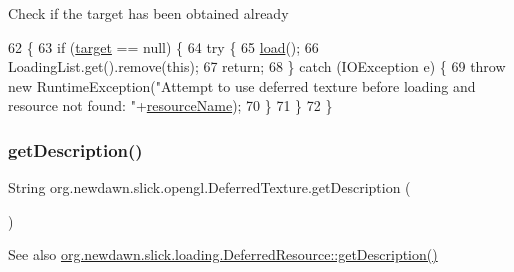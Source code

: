Check if the target has been obtained already 
\begin{DoxyCode}
62                                \{
63         \textcolor{keywordflow}{if} (\mbox{\hyperlink{classorg_1_1newdawn_1_1slick_1_1opengl_1_1_deferred_texture_aa70a4b195d0b965a0099d0e7bc18d9d2}{target}} == null) \{
64             \textcolor{keywordflow}{try} \{
65                 \mbox{\hyperlink{classorg_1_1newdawn_1_1slick_1_1opengl_1_1_deferred_texture_adaa55791770295ee94c057781634b50a}{load}}();
66                 LoadingList.get().remove(\textcolor{keyword}{this});
67                 \textcolor{keywordflow}{return};
68             \} \textcolor{keywordflow}{catch} (IOException e) \{
69                 \textcolor{keywordflow}{throw} \textcolor{keyword}{new} RuntimeException(\textcolor{stringliteral}{"Attempt to use deferred texture before loading and resource not
       found: "}+\mbox{\hyperlink{classorg_1_1newdawn_1_1slick_1_1opengl_1_1_deferred_texture_a883fc20f133626f8f49684adb5b65976}{resourceName}});
70             \}
71         \}
72     \}
\end{DoxyCode}
\mbox{\label{classorg_1_1newdawn_1_1slick_1_1opengl_1_1_deferred_texture_abf9a5bb64c03d9607eb4e2a9afffbe33}} 
\subsubsection{\texorpdfstring{get\+Description()}{getDescription()}}
{\footnotesize\ttfamily String org.\+newdawn.\+slick.\+opengl.\+Deferred\+Texture.\+get\+Description (\begin{DoxyParamCaption}{ }\end{DoxyParamCaption})\hspace{0.3cm}{\ttfamily [inline]}}

\begin{DoxySeeAlso}{See also}
\mbox{\hyperlink{interfaceorg_1_1newdawn_1_1slick_1_1loading_1_1_deferred_resource_ab529c610c01ad0aaab6361c13010ba06}{org.\+newdawn.\+slick.\+loading.\+Deferred\+Resource\+::get\+Description()}} 
\end{DoxySeeAlso}


